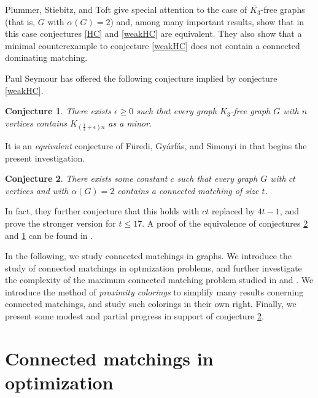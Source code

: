 \documentclass[12pt]{article}
\newtheorem{conj}{Conjecture}
\theoremstyle{definition}
\begin{document}
Plummer, Stiebitz, and Toft \cite{Spec_case} give special attention to the case of $\overline{K_3}$-free graphs (that is, $G$ with $\alpha(G) = 2$) and, among many important results, show that in this case conjectures \ref{HC} and \ref{weakHC} are equivalent.  They also show that a minimal counterexample to conjecture \ref{weakHC} does not contain a connected dominating matching.

Paul Seymour has offered the following conjecture implied by conjecture \ref{weakHC}.
\begin{conj}
	There exists $\epsilon \geq 0$ such that every graph $K_3$-free graph $G$ with $n$ vertices contains $K_{(\frac{1}{3} + \epsilon)n}$ as a minor.
\label{PS_conj}
\end{conj}
\noindent It is an \textit{equivalent} conjecture of F\"{u}redi, Gy{\'a}rf{\'a}s, and Simonyi in \cite{FGS} that begins the present investigation.
\begin{conj}	
	There exists some constant $c$ such that every graph $G$ with $ct$ vertices and with $\alpha(G) = 2$ contains a connected matching of size $t$.
\label{c_conj}
\end{conj}  
In fact, they further conjecture that this holds with $ct$ replaced by $4t-1$, and prove the stronger version for $t \leq 17$. A proof of the equivalence of conjectures \ref{c_conj} and \ref{PS_conj} can be found in \cite{DandMimprove}.

In the following, we study connected matchings in graphs.  We introduce the study of connected matchings in optmization problems, and further investigate the complexity of the maximum connected matching problem studied in \cite{Spec_case} and \cite{K_Cam}.  We introduce the method of \textit{proximity colorings} to simplify many results conerning connected matchings, and study such colorings in their own right.  Finally, we present some modest and partial progress in support of conjecture \ref{c_conj}.  

\section{Connected matchings in optimization}
\end{document}
